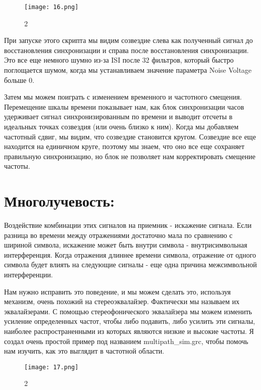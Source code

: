 \documentclass[10pt,a4paper,oneside]{article}
\begin{document}
\begin{figure}[H]
        \centering
        \texttt{[image: 16.png]}
        \caption{2}
        \label{fig:first}
\end{figure}

При запуске этого скрипта мы видим созвездие слева как полученный сигнал до восстановления синхронизации и справа после восстановления синхронизации. Это все еще немного шумно из-за ISI после 32 фильтров, который быстро поглощается шумом, когда мы устанавливаем значение параметра Noise Voltage больше 0.

Затем мы можем поиграть с изменением временного и частотного смещения. Перемещение шкалы времени показывает нам, как блок синхронизации часов удерживает сигнал синхронизированным по времени и выводит отсчеты в идеальных точках созвездия (или очень близко к ним). Когда мы добавляем частотный сдвиг, мы видим, что созвездие становится кругом. Созвездие все еще находится на единичном круге, поэтому мы знаем, что оно все еще сохраняет правильную синхронизацию, но блок не позволяет нам корректировать смещение частоты.

\section{Многолучевость:}

Воздействие комбинации этих сигналов на приемник - искажение сигнала. Если разница во времени между отражениями достаточно мала по сравнению с шириной символа, искажение может быть внутри символа - внутрисимвольная интерференция. Когда отражения длиннее времени символа, отражение от одного символа будет влиять на следующие сигналы - еще одна причина межсимвольной интерференции.

Нам нужно исправить это поведение, и мы можем сделать это, используя механизм, очень похожий на стереоэквалайзер. Фактически мы называем их эквалайзерами. С помощью стереофонического эквалайзера мы можем изменить усиление определенных частот, чтобы либо подавить, либо усилить эти сигналы, наиболее распространенными из которых являются низкие и высокие частоты. Я создал очень простой пример под названием multipath_sim.grc, чтобы помочь нам изучить, как это выглядит в частотной области.

\begin{figure}[H]
        \centering
        \texttt{[image: 17.png]}
        \caption{2}
        \label{fig:first}
\end{figure}
\end{document}
